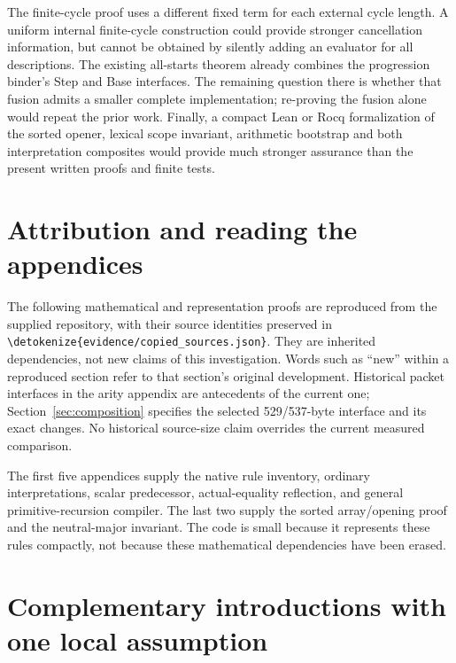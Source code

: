 \documentclass[11pt,letterpaper]{article}
\theoremstyle{definition}\newtheorem{definition}[theorem]{Definition}
\theoremstyle{remark}\newtheorem{remark}[theorem]{Remark}
\newcommand{\file}[1]{\expandafter\nolinkurl\expandafter{\detokenize{#1}}}
\begin{document}
The finite-cycle proof uses a different fixed term for each external
cycle length. A uniform internal finite-cycle construction could provide
stronger cancellation information, but cannot be obtained by silently
adding an evaluator for all descriptions. The existing all-starts theorem
already combines the progression binder's Step and Base interfaces. The
remaining question there is whether that fusion admits a smaller complete
implementation; re-proving the fusion alone would repeat the prior work.
Finally, a compact Lean or Rocq formalization of the sorted opener,
lexical scope invariant, arithmetic bootstrap and both interpretation
composites would provide much stronger assurance than the present
written proofs and finite tests.


\clearpage
\appendix
\section*{Attribution and reading the appendices}
The following mathematical and representation proofs are reproduced from
the supplied repository, with their source identities preserved in
\file{evidence/copied_sources.json}. They are inherited dependencies, not
new claims of this investigation. Words such as ``new'' within a reproduced
section refer to that section's original development. Historical packet
interfaces in the arity appendix are antecedents of the current one;
Section~\ref{sec:composition} specifies the selected 529/537-byte interface
and its exact changes. No historical source-size claim overrides the
current measured comparison.

The first five appendices supply the native rule inventory, ordinary
interpretations, scalar predecessor, actual-equality reflection, and
general primitive-recursion compiler. The last two supply the sorted
array/opening proof and the neutral-major invariant. The code is small
because it represents these rules compactly, not because these
mathematical dependencies have been erased.


\section{Complementary introductions with one local assumption}
\label{sec:choice-introduction}
\end{document}
